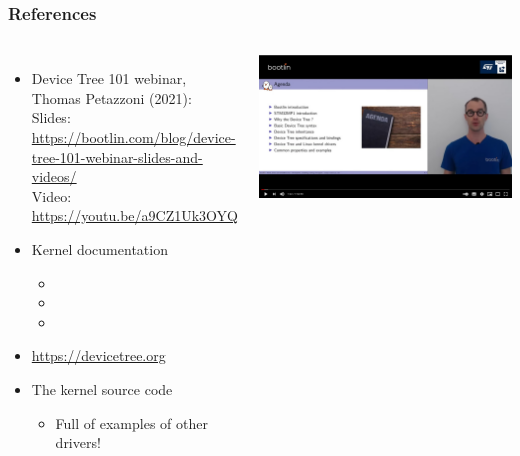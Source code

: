 \begin{frame}
  \frametitle{References}
  \begin{columns}
       \begin{itemize}
       \item Device Tree 101 webinar, Thomas Petazzoni (2021):\\
	     Slides: \url{https://bootlin.com/blog/device-tree-101-webinar-slides-and-videos/}\\
	     Video: \url{https://youtu.be/a9CZ1Uk3OYQ}
       \item Kernel documentation
         \begin{itemize}
         \item {}
         \item {}
         \item {}
         \end{itemize}
      \item \url{https://devicetree.org}
       \item The kernel source code
         \begin{itemize}
         \item Full of examples of other drivers!
         \end{itemize}
       \end{itemize}
    \includegraphics[width=\textwidth]{common/device-tree-video.jpg}
  \end{columns}
\end{frame}

